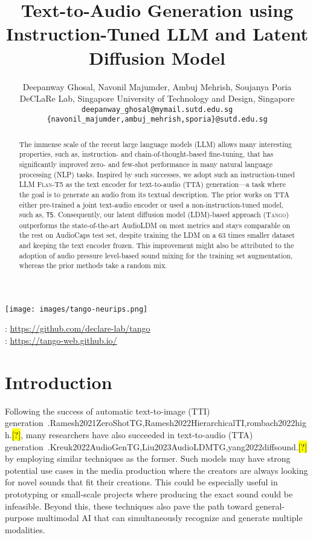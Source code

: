\documentclass{article}
\title{Text-to-Audio Generation using Instruction-Tuned LLM and Latent Diffusion Model}
\author{Deepanway Ghosal\textsuperscript{\ddag}, Navonil Majumder\textsuperscript{\ddag}, Ambuj Mehrish\textsuperscript{\ddag}, Soujanya Poria\textsuperscript{\ddag} \\
  \textsuperscript{\ddag} DeCLaRe Lab, Singapore University of Technology and Design, Singapore \\
  \texttt{deepanway\_ghosal@mymail.sutd.edu.sg} \\
  \texttt{\{navonil\_majumder,ambuj\_mehrish,sporia\}@sutd.edu.sg} \\
}
\newcommand{\model}{\textsc{Tango}}
\let\realcite\cite
\renewcommand{\cite}[1]{\ifx.#1.\hl{[?]}\else\realcite{#1}\fi}
\begin{document}
\maketitle
\begin{minipage}[t]{\linewidth}
  \begin{center}
    \texttt{[image: images/tango-neurips.png]}
  \end{center}
\end{minipage}
\vspace{0.3cm}
\begin{minipage}[t]{\linewidth}
  \centering
  \faGithub: \url{https://github.com/declare-lab/tango} \\
  \faGlobe : \url{https://tango-web.github.io/}
\end{minipage}


\begin{abstract}
The immense scale of the recent large language models (LLM) allows many interesting properties, such as, instruction- and chain-of-thought-based fine-tuning, that has significantly improved zero- and few-shot performance in many natural language processing (NLP) tasks. Inspired by such successes, we adopt such an instruction-tuned LLM \textsc{Flan-T5} as the text encoder for text-to-audio (TTA) generation---a task where the goal is to generate an audio from its textual description. The prior works on TTA either pre-trained a joint text-audio encoder or used a non-instruction-tuned model, such as, \texttt{T5}. Consequently, our latent diffusion model (LDM)-based approach (\model{}) outperforms the state-of-the-art AudioLDM on most metrics and stays comparable on the rest on AudioCaps test set, despite training the LDM on a 63 times smaller dataset and keeping the text encoder frozen. This improvement might also be attributed to the adoption of audio pressure level-based sound mixing for the training set augmentation, whereas the prior methods take a random mix. 
\end{abstract}

\section{Introduction}

Following the success of automatic text-to-image (TTI) generation~\cite{Ramesh2021ZeroShotTG,Ramesh2022HierarchicalTI,rombach2022high}, many researchers have also succeeded in text-to-audio (TTA) generation~\cite{Kreuk2022AudioGenTG,Liu2023AudioLDMTG,yang2022diffsound} by employing similar techniques as the former. Such models may have strong potential use cases in the media production where the creators are always looking for novel sounds that fit their creations. This could be especially useful in prototyping or small-scale projects where producing the exact sound could be infeasible. Beyond this, these techniques also pave the path toward general-purpose multimodal AI that can simultaneously recognize and generate multiple modalities. 
\end{document}

